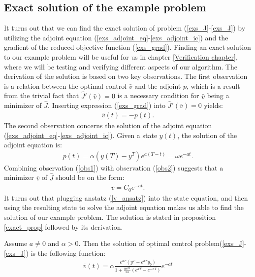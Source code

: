 \subsection{Exact solution of the example problem} \label{exact_sec}
It turns out that we can find the exact solution of problem (\ref{exs_J}-\ref{exs_J}) by utilizing the adjoint equation (\ref{exs_adjoint_eq}-\ref{exs_adjoint_ic}) and the gradient of the reduced objective function (\ref{exs_grad}). Finding an exact solution to our example problem will be useful for us in chapter \ref{Verification chapter}, where we will be testing and verifying different aspects of our algorithm. The derivation of the solution is based on two key observations. The first observation is a relation between the optimal control $\bar v$ and the adjoint $p$, which is a result from the trivial fact that $\hat J'(\bar v)=0$ is a necessary condition for $\bar v$ being a minimizer of $\hat J$. Inserting expression (\ref{exs_grad}) into $\hat J'(\bar v)=0$ yields:
\begin{align}
\bar v(t)=-p(t). \label{obs1}
\end{align} 
The second observation concerns the solution of the adjoint equation (\ref{exs_adjoint_eq}-\ref{exs_adjoint_ic}). Given a state $y(t)$, the solution of the adjoint equation is:
\begin{align}
p(t) = \alpha(y(T)-y^T)e^{a(T-t)} = \omega e^{-at}. \label{obs2}
\end{align}
Combining observation (\ref{obs1}) with observation (\ref{obs2}) suggests that a minimizer $\bar v$ of $\hat J$ should be on the form:
\begin{align}
\bar v = C_0 e^{-at}. \label{v_ansatz}
\end{align}
It turns out that plugging anstatz (\ref{v_ansatz}) into the state equation, and then using the resulting state to solve the adjoint equation makes us able to find the solution of our example problem. The solution is stated in proposition \ref{exact_prop} followed by its derivation.
\begin{proposition} \label{exact_prop}
Assume $a\neq0$ and $\alpha>0$. Then the solution of optimal control problem(\ref{exs_J}-\ref{exs_J}) is the following function:
\begin{align}
\bar v(t) = \alpha\frac{e^{aT}(y^T-e^{aT}y_0)}{1+\frac{\alpha e^{aT}}{2a}(e^{aT}-e^{-aT})}e^{-at}
\end{align}
\end{proposition}
